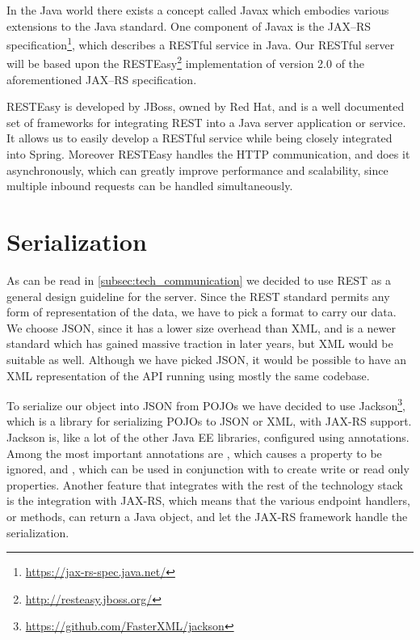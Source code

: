 \bigskip
In the Java world there exists a concept called Javax which embodies various extensions to the Java standard.
One component of Javax is the JAX--RS specification\footnote{\url{https://jax-rs-spec.java.net/}}, which describes a RESTful service in Java.
Our RESTful server will be based upon the RESTEasy\footnote{\url{http://resteasy.jboss.org/}} implementation of version 2.0 of the aforementioned JAX--RS specification.

RESTEasy is developed by JBoss, owned by Red Hat, and is a well documented set of frameworks for integrating REST into a Java server application or service.
It allows us to easily develop a RESTful service while being closely integrated into Spring.
Moreover RESTEasy handles the HTTP communication, and does it asynchronously, which can greatly improve performance and scalability,
since multiple inbound requests can be handled simultaneously.

\section{Serialization}\label{subsec:serialization_tech}
As can be read in \cref{subsec:tech_communication} we decided to use REST as a general design guideline for the server.
Since the REST standard permits any form of representation of the data, we have to pick a format to carry our data.
We choose JSON, since it has a lower size overhead than XML, and is a newer standard which has gained massive traction in later years, but XML would be suitable as well.
Although we have picked JSON, it would be possible to have an XML representation of the API running using mostly the same codebase.

To serialize our object into JSON from \acp{POJO} we have decided to use Jackson\footnote{\url{https://github.com/FasterXML/jackson}}, which is a library for serializing \acp{POJO} to JSON or XML, with JAX-RS support.
Jackson is, like a lot of the other \ac{Java EE} libraries, configured using annotations.
Among the most important annotations are , which causes a property to be ignored, and , which can be used in conjunction with  to create write or read only properties.
Another feature that integrates with the rest of the technology stack is the integration with JAX-RS, which means that the various endpoint handlers, or methods, can return a Java object, and let the JAX-RS framework handle the serialization.

